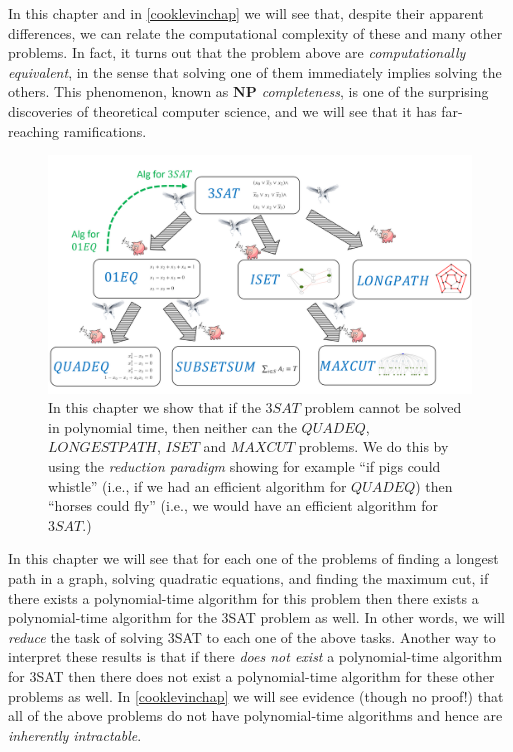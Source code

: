 In this chapter and in \cref{cooklevinchap} we will see that, despite
their apparent differences, we can relate the computational complexity
of these and many other problems. In fact, it turns out that the problem
above are \emph{computationally equivalent}, in the sense that solving
one of them immediately implies solving the others. This phenomenon,
known as \emph{\(\mathbf{NP}\) completeness}, is one of the surprising
discoveries of theoretical computer science, and we will see that it has
far-reaching ramifications.


\begin{figure}
\centering
\includegraphics[width=\textwidth, height=0.25\paperheight, keepaspectratio]{../figure/reductionsoverview.png}
\caption{In this chapter we show that if the
\(3\ensuremath{\mathit{SAT}}\) problem cannot be solved in polynomial
time, then neither can the \(\ensuremath{\mathit{QUADEQ}}\),
\(\ensuremath{\mathit{LONGESTPATH}}\), \(\ensuremath{\mathit{ISET}}\)
and \(\ensuremath{\mathit{MAXCUT}}\) problems. We do this by using the
\emph{reduction paradigm} showing for example ``if pigs could whistle''
(i.e., if we had an efficient algorithm for
\(\ensuremath{\mathit{QUADEQ}}\)) then ``horses could fly'' (i.e., we
would have an efficient algorithm for \(3\ensuremath{\mathit{SAT}}\).)}
\label{reductionsoverviewfig}
\end{figure}

In this chapter we will see that for each one of the problems of finding
a longest path in a graph, solving quadratic equations, and finding the
maximum cut, if there exists a polynomial-time algorithm for this
problem then there exists a polynomial-time algorithm for the 3SAT
problem as well. In other words, we will \emph{reduce} the task of
solving 3SAT to each one of the above tasks. Another way to interpret
these results is that if there \emph{does not exist} a polynomial-time
algorithm for 3SAT then there does not exist a polynomial-time algorithm
for these other problems as well. In \cref{cooklevinchap} we will see
evidence (though no proof!) that all of the above problems do not have
polynomial-time algorithms and hence are \emph{inherently intractable}.

